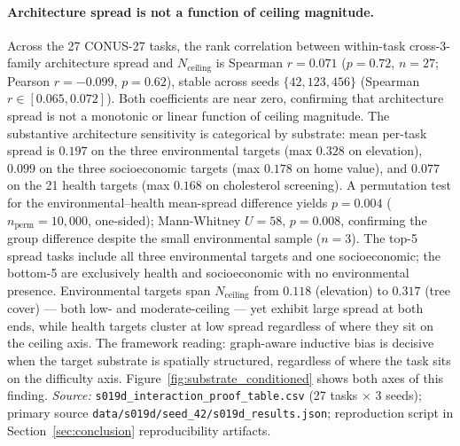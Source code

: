 \documentclass{article}
\begin{document}
\paragraph{Architecture spread is not a function of ceiling magnitude.}
Across the 27 CONUS-27 tasks, the rank correlation between within-task cross-3-family architecture spread and $N_{\text{ceiling}}$ is Spearman $r = 0.071$ ($p = 0.72$, $n = 27$; Pearson $r = -0.099$, $p = 0.62$), stable across seeds $\{42, 123, 456\}$ (Spearman $r \in [0.065, 0.072]$). Both coefficients are near zero, confirming that architecture spread is not a monotonic or linear function of ceiling magnitude. The substantive architecture sensitivity is categorical by substrate: mean per-task spread is $0.197$ on the three environmental targets (max $0.328$ on elevation), $0.099$ on the three socioeconomic targets (max $0.178$ on home value), and $0.077$ on the 21 health targets (max $0.168$ on cholesterol screening). A permutation test for the environmental--health mean-spread difference yields $p = 0.004$ ($n_{\text{perm}} = 10{,}000$, one-sided); Mann-Whitney $U = 58$, $p = 0.008$, confirming the group difference despite the small environmental sample ($n = 3$). The top-5 spread tasks include all three environmental targets and one socioeconomic; the bottom-5 are exclusively health and socioeconomic with no environmental presence. Environmental targets span $N_{\text{ceiling}}$ from $0.118$ (elevation) to $0.317$ (tree cover) --- both low- and moderate-ceiling --- yet exhibit large spread at both ends, while health targets cluster at low spread regardless of where they sit on the ceiling axis. The framework reading: graph-aware inductive bias is decisive when the target substrate is spatially structured, regardless of where the task sits on the difficulty axis. Figure~\ref{fig:substrate_conditioned} shows both axes of this finding. \emph{Source:} \texttt{s019d\_interaction\_proof\_table.csv} (27 tasks $\times$ 3 seeds); primary source \texttt{data/s019d/seed\_42/s019d\_results.json}; reproduction script in Section~\ref{sec:conclusion} reproducibility artifacts.
\end{document}
